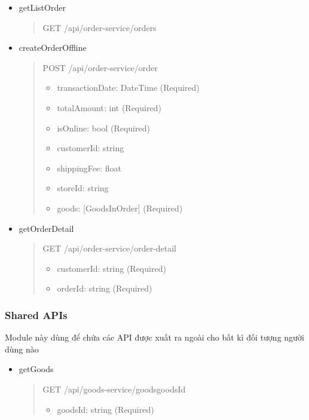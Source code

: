 \begin{itemize}
	\item getListOrder
	      \begin{quote}
		      GET /api/order-service/orders
	      \end{quote}


	\item createOrderOffline
	      \begin{quote}
		      POST /api/order-service/order
		      \begin{itemize}
			      \item transactionDate: DateTime (Required)
			      \item totalAmount: int (Required)
			      \item isOnline: bool (Required)
			      \item customerId: string
			      \item shippingFee: float
			      \item storeId: string
			      \item goods: [GoodsInOrder] (Required)
		      \end{itemize}
	      \end{quote}

	\item getOrderDetail
	      \begin{quote}
		      GET /api/order-service/order-detail
		      \begin{itemize}
			      \item customerId: string (Required)
			      \item orderId: string (Required)
		      \end{itemize}
	      \end{quote}
\end{itemize}



\subsubsection{Shared APIs}
Module này dùng để chứa các API được xuất ra ngoài cho bất kì đối tượng người dùng nào

\begin{itemize}
	\item getGoods
	      \begin{quote}
		      GET /api/goods-service/goods{goodsId}
		      \begin{itemize}
			      \item goodsId: string (Required)
		      \end{itemize}
	      \end{quote}
\end{itemize}

